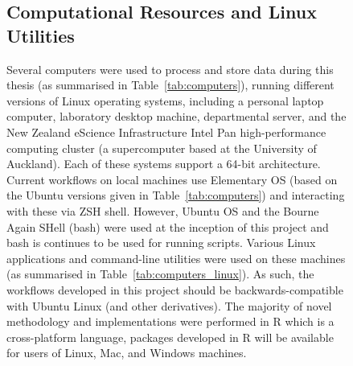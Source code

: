 \begin{figure}[!htp]
\subsection{Computational Resources and Linux Utilities}

Several computers were used to process and store data during this thesis (as summarised in Table~\ref{tab:computers}), running different versions of Linux operating systems, including a personal laptop computer, laboratory desktop machine, departmental server, and the New Zealand eScience Infrastructure Intel Pan high-performance computing cluster (a supercomputer based at the University of Auckland). Each of these systems support a 64-bit architecture. Current workflows on local machines use Elementary OS (based on the Ubuntu versions given in Table~\ref{tab:computers}) and interacting with these via ZSH shell. However, Ubuntu OS and the Bourne Again SHell (bash) were used at the inception of this project and bash is continues to be used for running scripts. Various Linux applications and command-line utilities were used on these machines (as summarised in Table~\ref{tab:computers_linux}). As such, the workflows developed in this project should be backwards-compatible with Ubuntu Linux (and other derivatives). The majority of novel methodology and implementations were performed in R which is a cross-platform language, packages developed in R will be available for users of Linux, Mac, and Windows machines.  



\end{figure}
